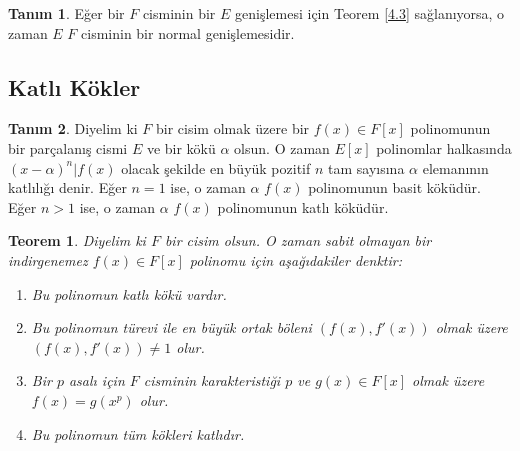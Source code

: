 \documentclass{article}
\newtheorem{thm}{Teorem}[section]
\theoremstyle{definition}
\newtheorem{defn}{Tanım}[section]
\theoremstyle{remark}
\begin{document}
    	    \begin{defn}
    	        Eğer bir $F$ cisminin bir $E$ genişlemesi için Teorem \ref{4.3} sağlanıyorsa, o zaman $E$ $F$ cisminin bir normal genişlemesidir.
    	    \end{defn}
	        
    	\subsection{Katlı Kökler}
    	
    	    \begin{defn}
    	        Diyelim ki $F$ bir cisim olmak üzere bir $f(x) \in F[x]$ polinomunun bir parçalanış cismi $E$ ve bir kökü $\alpha$ olsun. O zaman $E[x]$ polinomlar halkasında $(x - \alpha)^n | f(x)$ olacak şekilde en büyük pozitif $n$ tam sayısına $\alpha$ elemanının katlılığı denir. Eğer $n = 1$ ise, o zaman $\alpha$ $f(x)$ polinomunun basit köküdür. Eğer $n > 1$ ise, o zaman $\alpha$ $f(x)$ polinomunun katlı köküdür.
    	    \end{defn}
    	    
    	    \begin{thm}
    	        Diyelim ki $F$ bir cisim olsun. O zaman sabit olmayan bir indirgenemez $f(x) \in F[x]$ polinomu için aşağıdakiler denktir:
    	        \begin{enumerate}
				\renewcommand{\labelenumi}{(\roman{enumi})}
				    \item Bu polinomun katlı kökü vardır.
				    \item Bu polinomun türevi ile en büyük ortak böleni $(f(x), f'(x))$ olmak üzere $(f(x), f'(x)) \neq 1$ olur.
				    \item Bir $p$ asalı için $F$ cisminin karakteristiği $p$ ve $g(x) \in F[x]$ olmak üzere $f(x) = g(x^p)$ olur.
				    \item Bu polinomun tüm kökleri katlıdır.
				\end{enumerate}
    	    \end{thm}
    	    
\end{document}
